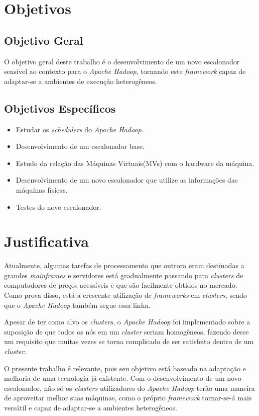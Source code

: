 
\section{Objetivos}
\subsection{Objetivo Geral}
O objetivo geral deste trabalho é o desenvolvimento de um novo escalonador sensível ao contexto para o \emph{Apache Hadoop}, tornando este \emph{framework} capaz de adaptar-se a ambientes de execução heterogêneos.

\subsection{Objetivos Específicos}
\begin{itemize}
   \item Estudar os \emph{schedulers} do \emph{Apache Hadoop}.
   \item Desenvolvimento de um escalonador base.
   \item Estudo da relação das Máquinas Virtuais(MVs) com o hardware da máquina.
   \item Desenvolvimento de um novo escalonador que utilize as informações das máquinas físicas.
   \item Testes do novo escalonador.
\end{itemize}

\section{Justificativa}

Atualmente, algumas tarefas de processamento que outrora eram destinadas a grandes \emph{mainframes} e servidores está gradualmente passando para \emph{clusters} de computadores de preços acessíveis e que são facilmente obtidos no mercado. Como prova disso, está a crescente utilização de \emph{frameworks} em \emph{clusters}, sendo que o \emph{Apache Hadoop} também segue essa linha. 

Apesar de ter como alvo os \emph{clusters}, o \emph{Apache Hadoop} foi implementado sobre a suposição de que todos os nós em um \emph{cluster} seriam homogêneos, fazendo desse um requisito que muitas vezes se torna complicado de ser satisfeito dentro de um \emph{cluster}.

O presente trabalho é relevante, pois seu objetivo está baseado na adaptação e melhoria de uma tecnologia já existente. Com o desenvolvimento de um novo escalonador, não só os \emph{clusters} utilizadores do \emph{Apache Hadoop} terão uma maneira de aproveitar melhor suas máquinas, como o próprio \emph{framework} tornar-se-á mais versátil e capaz de adaptar-se a ambientes heterogêneos.
